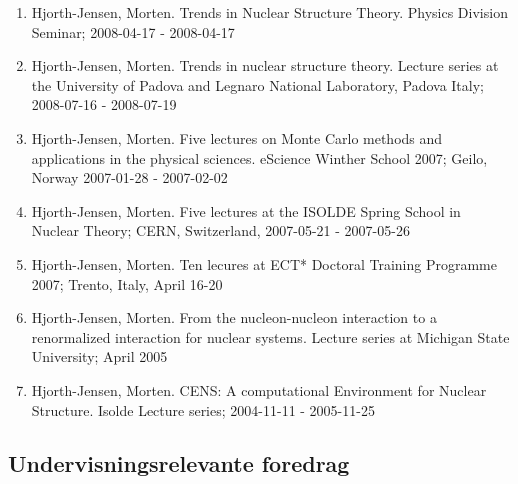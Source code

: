 \documentclass[aps,floatfix,preprint]{revtex4-1}
\begin{document}
\begin{enumerate}
\item Hjorth-Jensen, Morten.  Trends in Nuclear Structure Theory. Physics Division Seminar; 2008-04-17 - 2008-04-17

\item Hjorth-Jensen, Morten.  Trends in nuclear structure theory. Lecture series at the University of Padova and Legnaro National Laboratory, Padova Italy; 2008-07-16 - 2008-07-19

\item Hjorth-Jensen, Morten.  Five lectures on  Monte Carlo methods and applications in the physical sciences. eScience Winther School 2007; Geilo, Norway 2007-01-28 - 2007-02-02

\item Hjorth-Jensen, Morten.  Five lectures at the ISOLDE Spring School in Nuclear Theory; CERN, Switzerland, 2007-05-21 - 2007-05-26

\item Hjorth-Jensen, Morten.  Ten lecures at  ECT* Doctoral Training Programme 2007; Trento, Italy, April 16-20

\item Hjorth-Jensen, Morten.  From the nucleon-nucleon interaction to a renormalized interaction for nuclear systems. Lecture series at Michigan State University; April 2005

\item Hjorth-Jensen, Morten. CENS: A computational Environment for Nuclear Structure. Isolde Lecture series; 2004-11-11 - 2005-11-25
\end{enumerate}


\subsection*{Undervisningsrelevante foredrag}
\end{document}
